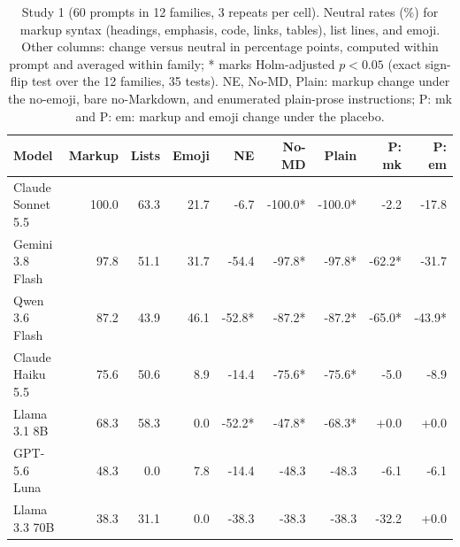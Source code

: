 \begin{table}[t]
\centering
\footnotesize
\caption{Study 1 (60 prompts in 12 families, 3 repeats per cell). Neutral rates (\%) for markup syntax (headings, emphasis, code, links, tables), list lines, and emoji. Other columns: change versus neutral in percentage points, computed within prompt and averaged within family; * marks Holm-adjusted $p<0.05$ (exact sign-flip test over the 12 families, 35 tests). NE, No-MD, Plain: markup change under the no-emoji, bare no-Markdown, and enumerated plain-prose instructions; P: mk and P: em: markup and emoji change under the placebo.}
\label{tab:v2-routes}
\begin{tabular}{lrrrrrrrr}
\toprule
Model & Markup & Lists & Emoji & NE & No-MD & Plain & P: mk & P: em \\
\midrule
Claude Sonnet 5.5 & 100.0 & 63.3 & 21.7 & -6.7 & -100.0* & -100.0* & -2.2 & -17.8 \\
Gemini 3.8 Flash & 97.8 & 51.1 & 31.7 & -54.4 & -97.8* & -97.8* & -62.2* & -31.7 \\
Qwen 3.6 Flash & 87.2 & 43.9 & 46.1 & -52.8* & -87.2* & -87.2* & -65.0* & -43.9* \\
Claude Haiku 5.5 & 75.6 & 50.6 & 8.9 & -14.4 & -75.6* & -75.6* & -5.0 & -8.9 \\
Llama 3.1 8B & 68.3 & 58.3 & 0.0 & -52.2* & -47.8* & -68.3* & +0.0 & +0.0 \\
GPT-5.6 Luna & 48.3 & 0.0 & 7.8 & -14.4 & -48.3 & -48.3 & -6.1 & -6.1 \\
Llama 3.3 70B & 38.3 & 31.1 & 0.0 & -38.3 & -38.3 & -38.3 & -32.2 & +0.0 \\
\bottomrule
\end{tabular}
\end{table}
